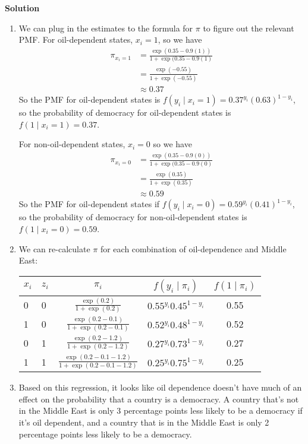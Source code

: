 \documentclass[11pt]{article}
\begin{document}
\textbf{Solution}

\begin{enumerate}
	\item We can plug in the estimates to the formula for $\pi$ to figure out the relevant PMF. For oil-dependent states, $x_i=1$, so we have
	\begin{align*}
		\pi_{x_i=1} &= \frac{\exp(0.35 - 0.9 (1))}{1 + \exp(0.35 - 0.9 (1)} \\
		&= \frac{\exp(-0.55)}{1 + \exp(-0.55)} \\
		&\approx 0.37
	\end{align*}
	So the PMF for oil-dependent states is $f(y_i \mid x_i = 1) = 0.37^{y_i} (0.63)^{1-y_i}$, so the probability of democracy for oil-dependent states is $f(1 \mid x_i = 1) = 0.37$. 
	
	For non-oil-dependent states, $x_i = 0$ so we have
	\begin{align*}
	\pi_{x_i=0} &= \frac{\exp(0.35 - 0.9 (0))}{1 + \exp(0.35 - 0.9 (0)} \\
	&= \frac{\exp(0.35)}{1 + \exp(0.35)} \\
	&\approx 0.59
	\end{align*}
	So the PMF for oil-dependent states if $f(y_i \mid x_i = 0) = 0.59^{y_i}(0.41)^{1-y_i}$, so the probability of democracy for non-oil-dependent states is $f(1 \mid x_i = 0) = 0.59$. 

	\item We can re-calculate $\pi$ for each combination of oil-dependence and Middle East:
	\begin{center}%
	\begin{tabular}{ll|ccc}\toprule
		$x_i$ & $z_i$ & $\pi_i$ & $f(y_i \mid \pi_i)$ & $f(1 \mid \pi_i)$ \\\midrule
		0 & 0 & $\frac{\exp(0.2)}{1 + \exp(0.2)}$ & $0.55^{y_i}0.45^{1-y_i}$ & 0.55 \\[4ex]
		1 & 0 & $\frac{\exp(0.2 - 0.1)}{1 + \exp(0.2 - 0.1)}$ & $0.52^{y_i}0.48^{1-y_i}$ & 0.52 \\[4ex]
		0 & 1 & $\frac{\exp(0.2 - 1.2)}{1 + \exp(0.2 - 1.2)} $ & $0.27^{y_i}0.73^{1 - y_i}$ & 0.27 \\[4ex]
		1 & 1 & $\frac{\exp(0.2 - 0.1 -1.2)}{1 + \exp(0.2 - 0.1 -1.2)}$ & $0.25^{y_i}0.75^{1-y_i} $ & 0.25 \\[2ex]\bottomrule
	\end{tabular}%
	\end{center}
	
	\item Based on this regression, it looks like oil dependence doesn't have much of an effect on the probability that a country is a democracy. A country that's not in the Middle East is only 3 percentage points less likely to be a democracy if it's oil dependent, and a country that is in the Middle East is only 2 percentage points less likely to be a democracy. 
\end{enumerate}
\end{document}
